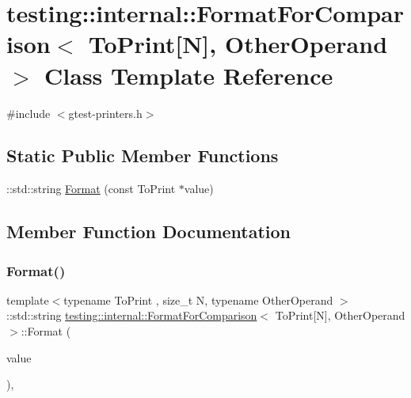 \hypertarget{classtesting_1_1internal_1_1_format_for_comparison_3_01_to_print[_n]_00_01_other_operand_01_4}{}\section{testing\+::internal\+::Format\+For\+Comparison$<$ To\+Print\mbox{[}N\mbox{]}, Other\+Operand $>$ Class Template Reference}
\label{classtesting_1_1internal_1_1_format_for_comparison_3_01_to_print[_n]_00_01_other_operand_01_4}


{\ttfamily \#include $<$gtest-\/printers.\+h$>$}

\subsection*{Static Public Member Functions}
\begin{DoxyCompactItemize}
\item 
\+::std\+::string \mbox{\hyperlink{classtesting_1_1internal_1_1_format_for_comparison_3_01_to_print[_n]_00_01_other_operand_01_4_a76c526461c8fa7df75f7b32ab889b9e0}{Format}} (const To\+Print $\ast$value)
\end{DoxyCompactItemize}


\subsection{Member Function Documentation}
\mbox{\label{classtesting_1_1internal_1_1_format_for_comparison_3_01_to_print[_n]_00_01_other_operand_01_4_a76c526461c8fa7df75f7b32ab889b9e0}} 
\subsubsection{\texorpdfstring{Format()}{Format()}}
{\footnotesize\ttfamily template$<$typename To\+Print , size\+\_\+t N, typename Other\+Operand $>$ \\
\+::std\+::string \mbox{\hyperlink{classtesting_1_1internal_1_1_format_for_comparison}{testing\+::internal\+::\+Format\+For\+Comparison}}$<$ To\+Print\mbox{[}N\mbox{]}, Other\+Operand $>$\+::Format (\begin{DoxyParamCaption}\item[{const To\+Print $\ast$}]{value }\end{DoxyParamCaption})\hspace{0.3cm}{\ttfamily [inline]}, {\ttfamily [static]}}



